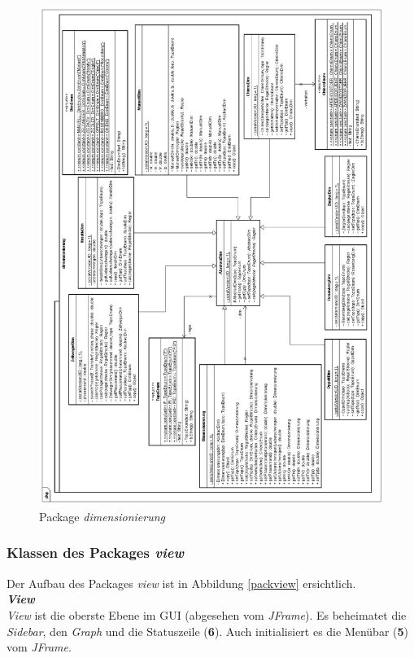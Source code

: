 \begin{figure}[p]
\centering
\includegraphics[width=1\textwidth]{packdim.png}
\caption{Package \textit{dimensionierung}}
\label{packdim}
\end{figure}

\newpage
\subsubsection{Klassen des Packages \textit{view}}
Der Aufbau des Packages \textit{view} ist in Abbildung \ref{packview} ersichtlich.\\

\textit{\textbf{View}}\\
\textit{View} ist die oberste Ebene im GUI (abgesehen vom \textit{JFrame}). Es beheimatet die \textit{Sidebar}, den \textit{Graph} und die Statuszeile (\textbf{6}). Auch initialisiert es die Menübar (\textbf{5}) vom \textit{JFrame}.\\

